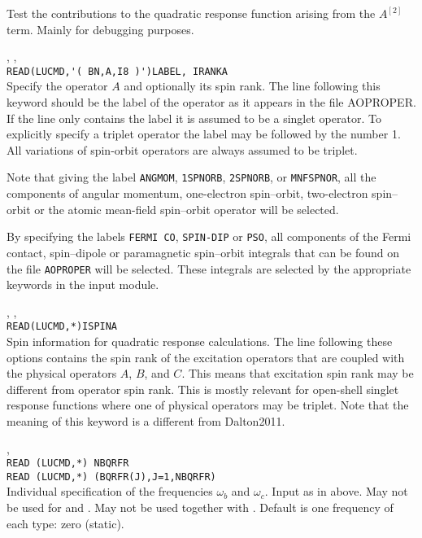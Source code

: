 \begin{description}

\item{}
Test the contributions to the quadratic response function arising from
the $A^{\left[2\right]}$ term. Mainly for debugging purposes.

\item{, , }\\
\verb|READ(LUCMD,'( BN,A,I8 )')LABEL, IRANKA|\\
Specify the operator $A$ and optionally its spin rank. The line following this
keyword should be the label of the operator as it appears in the file
AOPROPER. If the line only contains the label it is assumed to be a singlet
operator. To explicitly specify a triplet operator the label may be followed by the number 1. All variations of spin-orbit operators are always assumed to be triplet.

Note that giving the label \verb|ANGMOM|, \verb|1SPNORB|,
\verb|2SPNORB|, or \verb|MNFSPNOR|, all the components of angular
momentum, one-electron spin--orbit, two-electron spin--orbit or the
atomic mean-field spin--orbit operator will be selected.

By specifying the labels \verb|FERMI CO|, \verb|SPIN-DIP| or
\verb|PSO|, all components of the Fermi contact, spin--dipole or
paramagnetic spin--orbit integrals that can be found on the file
\verb|AOPROPER| will be selected. These integrals are selected by the
appropriate keywords in the  input module.

\item{, , }\\
\verb|READ(LUCMD,*)ISPINA|\\
Spin information for quadratic response calculations.
The line following these options contains the spin
rank of the excitation operators that are coupled with the
physical operators $A$, $B$, and $C$. This means that excitation spin rank may
be different from operator spin rank. 
This is mostly relevant for open-shell singlet response functions 
where one of physical operators may be triplet.
Note that the meaning of this keyword is a different from Dalton2011.

\item{, }\\
\verb|READ (LUCMD,*) NBQRFR|\\
\verb|READ (LUCMD,*) (BQRFR(J),J=1,NBQRFR)|\\
Individual specification of the frequencies $\omega_b$ and $\omega_c$.
Input as in  above.
May not be used for  and .
May not be used together with .
Default is one frequency of each type: zero (static).


\end{description}
